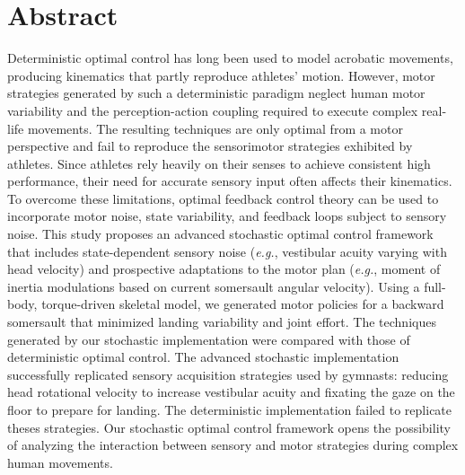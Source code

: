 \documentclass[10pt,letterpaper]{article}
\begin{document}
\section*{Abstract}
Deterministic optimal control has long been used to model acrobatic movements, producing kinematics that partly reproduce athletes' motion. 
However, motor strategies generated by such a deterministic paradigm neglect human motor variability and the perception-action coupling required to execute complex real-life movements.
The resulting techniques are only optimal from a motor perspective and fail to reproduce the sensorimotor strategies exhibited by athletes.
Since athletes rely heavily on their senses to achieve consistent high performance, their need for accurate sensory input often affects their kinematics. 
To overcome these limitations, optimal feedback control theory can be used to incorporate motor noise, state variability, and feedback loops subject to sensory noise. 
This study proposes an advanced stochastic optimal control framework that includes state-dependent sensory noise (\textit{e.g.}, vestibular acuity varying with head velocity) and prospective adaptations to the motor plan (\textit{e.g.}, moment of inertia modulations based on current somersault angular velocity). 
Using a full-body, torque-driven skeletal model, we generated motor policies for a backward somersault that minimized landing variability and joint effort. 
The techniques generated by our stochastic implementation were compared with those of deterministic optimal control. 
The advanced stochastic implementation successfully replicated sensory acquisition strategies used by gymnasts: reducing head rotational velocity to increase vestibular acuity and fixating the gaze on the floor to prepare for landing.
The deterministic implementation failed to replicate theses strategies.
Our stochastic optimal control framework opens the possibility of analyzing the interaction between sensory and motor strategies during complex human movements.


\end{document}
